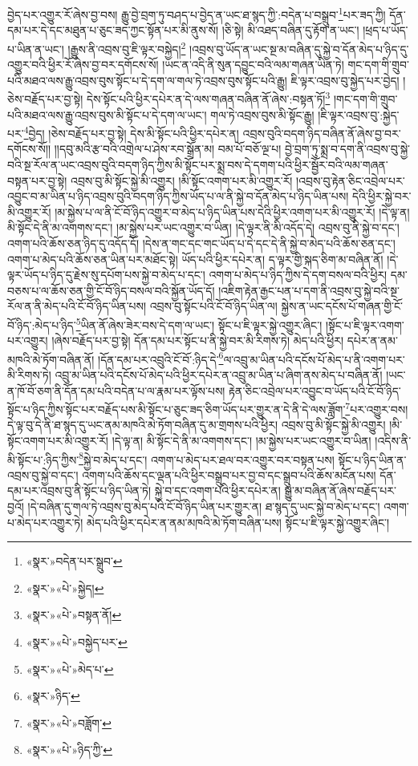 བྱེད་པར་འགྱུར་རོ་ཞེས་བྱ་བས། རྒྱུ་བྱེ་བྲག་ཏུ་བཤད་པ་བྱེད་ན་ཡང་ཐ་སྙད་ཀྱི་:བདེན་པ་བསྒྲུབ་\footnote{«སྣར་»བདེན་པར་སྒྲུབ་}པར་ཟད་ཀྱི། དོན་དམ་པར་དེ་དང་མཐུན་པ་ཅུང་ཟད་ཀྱང་སྟོན་པར་མི་ནུས་སོ། །ཅི་སྟེ། མི་འཐད་བཞིན་དུ་རྟོག་ན་ཡང་། །ཕྲད་པ་ཡོད་པ་ཡིན་ན་ཡང་། །རྒྱུས་ནི་འབྲས་བུ་ཇི་ལྟར་བསྐྱེད།\footnote{«སྣར་»«པེ་»སྐྱེད།} །འབྲས་བུ་ཡོད་ན་ཡང་སྔ་མ་བཞིན་དུ་སྐྱེ་བ་དོན་མེད་པ་ཉིད་དུ་འགྱུར་བའི་ཕྱིར་རོ་ཞེས་བྱ་བར་དགོངས་སོ། །ཡང་ན་འདི་ནི་སུན་དབྱུང་བའི་ལམ་གཞན་ཡིན་ཏེ། གང་དག་གི་གྲུབ་པའི་མཐའ་ལས་རྒྱུ་འབྲས་བུས་སྟོང་པ་དེ་དག་ལ་གལ་ཏེ་འབྲས་བུས་སྟོང་པའི་རྒྱུ། ཇི་ལྟར་འབྲས་བུ་སྐྱེད་པར་བྱེད། །ཅེས་བརྗོད་པར་བྱ་སྟེ། དེས་སྟོང་པའི་ཕྱིར་དཔེར་ན་དེ་ལས་གཞན་བཞིན་ནོ་ཞེས་:བསྟན་ཏོ།\footnote{«སྣར་»«པེ་»བསྟན་ནོ།} །གང་དག་གི་གྲུབ་པའི་མཐའ་ལས་རྒྱུ་འབྲས་བུས་མི་སྟོང་པ་དེ་དག་ལ་ཡང་། གལ་ཏེ་འབྲས་བུས་མི་སྟོང་རྒྱུ། །ཇི་ལྟར་འབྲས་བུ་:སྐྱེད་པར་\footnote{«སྣར་»«པེ་»བསྐྱེད་པར་}བྱེད། །ཅེས་བརྗོད་པར་བྱ་སྟེ། དེས་མི་སྟོང་པའི་ཕྱིར་དཔེར་ན། འབྲས་བུའི་བདག་ཉིད་བཞིན་ནོ་ཞེས་བྱ་བར་དགོངས་སོ།། །།དབུ་མའི་རྩ་བའི་འགྲེལ་པ་ཤེས་རབ་སྒྲོན་མ། བམ་པོ་བཅོ་ལྔ་པ། བྱེ་བྲག་ཏུ་སྨྲ་བ་དག་ནི་འབྲས་བུ་སྐྱེ་བའི་སྔ་རོལ་ན་ཡང་འབྲས་བུའི་བདག་ཉིད་ཀྱིས་མི་སྟོང་པར་སྨྲ་བས་དེ་དགག་པའི་ཕྱིར་སྦྱོར་བའི་ལམ་གཞན་བསྟན་པར་བྱ་སྟེ། འབྲས་བུ་མི་སྟོང་སྐྱེ་མི་འགྱུར། །མི་སྟོང་འགག་པར་མི་འགྱུར་རོ། །འབྲས་བུ་རྟེན་ཅིང་འབྲེལ་པར་འབྱུང་བ་མ་ཡིན་པ་ཉིད་འབྲས་བུའི་བདག་ཉིད་ཀྱིས་ཡོད་པ་ལ་ནི་སྐྱེ་བ་དོན་མེད་པ་ཉིད་ཡིན་པས། དེའི་ཕྱིར་སྐྱེ་བར་མི་འགྱུར་རོ། །མ་སྐྱེས་པ་ལ་ནི་ངོ་བོ་ཉིད་འགྱུར་བ་མེད་པ་ཉིད་ཡིན་པས་དེའི་ཕྱིར་འགག་པར་མི་འགྱུར་རོ། །དེ་ལྟ་ན། མི་སྟོང་དེ་ནི་མ་འགགས་དང་། །མ་སྐྱེས་པར་ཡང་འགྱུར་བ་ཡིན། །དེ་ལྟར་ནི་མི་འདོད་དེ། འབྲས་བུ་ནི་སྐྱེ་བ་དང་། འགག་པའི་ཆོས་ཅན་ཉིད་དུ་འདོད་དོ། །དེས་ན་གང་དང་གང་ཡོད་པ་དེ་དང་དེ་ནི་སྐྱེ་བ་མེད་པའི་ཆོས་ཅན་དང་། འགག་པ་མེད་པའི་ཆོས་ཅན་ཡིན་པར་མཐོང་སྟེ། ཡོད་པའི་ཕྱིར་དཔེར་ན། ད་ལྟར་གྱི་སྐད་ཅིག་མ་བཞིན་ནོ། །དེ་ལྟར་ཡོད་པ་ཉིད་དུ་རྗེས་སུ་དཔོག་པས་སྐྱེ་བ་མེད་པ་དང་། འགག་པ་མེད་པ་ཉིད་ཀྱིས་དེ་དག་བསལ་བའི་ཕྱིར། དམ་བཅས་པ་ལ་ཆོས་ཅན་གྱི་ངོ་བོ་ཉིད་བསལ་བའི་སྐྱོན་ཡོད་དོ། །འཇིག་རྟེན་རྒྱང་པན་པ་དག་ནི་འབྲས་བུ་སྐྱེ་བའི་སྔ་རོལ་ན་ནི་མེད་པའི་ངོ་བོ་ཉིད་ཡིན་པས། འབྲས་བུ་སྟོང་པའི་ངོ་བོ་ཉིད་ཡིན་ལ། སྐྱེས་ན་ཡང་དངོས་པོ་གཞན་གྱི་ངོ་བོ་ཉིད་:མེད་པ་ཉིད་\footnote{«སྣར་»«པེ་»མེད་པ་}ཡིན་ནོ་ཞེས་ཟེར་བས་དེ་དག་ལ་ཡང་། སྟོང་པ་ཇི་ལྟར་སྐྱེ་འགྱུར་ཞིང་། །སྟོང་པ་ཇི་ལྟར་འགག་པར་འགྱུར། །ཞེས་བརྗོད་པར་བྱ་སྟེ། དོན་དམ་པར་སྟོང་པ་ནི་སྐྱེ་བར་མི་རིགས་ཏེ། མེད་པའི་ཕྱིར། དཔེར་ན་ནམ་མཁའི་མེ་ཏོག་བཞིན་ནོ། །དོན་དམ་པར་འབྲུའི་ངོ་བོ་:ཉིད་དེ་\footnote{«སྣར་»ཉིད་}ལ་འབྲུ་མ་ཡིན་པའི་དངོས་པོ་མེད་པ་ནི་འགག་པར་མི་རིགས་ཏེ། འབྲུ་མ་ཡིན་པའི་དངོས་པོ་མེད་པའི་ཕྱིར་དཔེར་ན་འབྲུ་མ་ཡིན་པ་ཞིག་ནས་མེད་པ་བཞིན་ནོ། །ཡང་ན་ཁོ་བོ་ཅག་ནི་དོན་དམ་པའི་བདེན་པ་ལ་རྣམ་པར་ལྟོས་པས། རྟེན་ཅིང་འབྲེལ་པར་འབྱུང་བ་ཡོད་པའི་ངོ་བོ་ཉིད་སྟོང་པ་ཉིད་ཀྱིས་སྟོང་པར་བརྗོད་པས་མི་སྟོང་པ་ཅུང་ཟད་ཅིག་ཡོད་པར་གྱུར་ན་དེ་ནི་དེ་ལས་ཟློག་\footnote{«སྣར་»«པེ་»བཟློག་}པར་འགྱུར་བས། དེ་ལྟ་བུ་དེ་ནི་ཐ་སྙད་དུ་ཡང་ནམ་མཁའི་མེ་ཏོག་བཞིན་དུ་མ་གྲགས་པའི་ཕྱིར། འབྲས་བུ་མི་སྟོང་སྐྱེ་མི་འགྱུར། །མི་སྟོང་འགག་པར་མི་འགྱུར་རོ། །དེ་ལྟ་ན། མི་སྟོང་དེ་ནི་མ་འགགས་དང་། །མ་སྐྱེས་པར་ཡང་འགྱུར་བ་ཡིན། །འདིས་ནི་མི་སྟོང་པ་:ཉིད་ཀྱིས་\footnote{«སྣར་»«པེ་»ཉིད་ཀྱི་}སྐྱེ་བ་མེད་པ་དང་། འགག་པ་མེད་པར་ཐལ་བར་འགྱུར་བར་བསྟན་པས། སྟོང་པ་ཉིད་ཡིན་ན་འབྲས་བུ་སྐྱེ་བ་དང་། འགག་པའི་ཆོས་དང་ལྡན་པའི་ཕྱིར་བསྒྲུབ་པར་བྱ་བ་དང་སྒྲུབ་པའི་ཆོས་མངོན་པས། དོན་དམ་པར་འབྲས་བུ་ནི་སྟོང་པ་ཉིད་ཡིན་ཏེ། སྐྱེ་བ་དང་འགག་པའི་ཕྱིར་དཔེར་ན། སྒྱུ་མ་བཞིན་ནོ་ཞེས་བརྗོད་པར་བྱའོ། །དེ་བཞིན་དུ་གལ་ཏེ་འབྲས་བུ་མེད་པའི་ངོ་བོ་ཉིད་ཡིན་པར་གྱུར་ན། ཐ་སྙད་དུ་ཡང་སྐྱེ་བ་མེད་པ་དང་། འགག་པ་མེད་པར་འགྱུར་ཏེ། མེད་པའི་ཕྱིར་དཔེར་ན་ནམ་མཁའི་མེ་ཏོག་བཞིན་པས། སྟོང་པ་ཇི་ལྟར་སྐྱེ་འགྱུར་ཞིང་། 